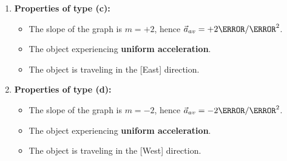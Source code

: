 \documentclass[12pt]{article}
\theoremstyle{break}
\begin{document}
\begin{enumerate}[label = (\alph*)]
	\item 
		
		\textbf{\large{Properties of type (c):}}
		\begin{itemize}
			\item The slope of the graph is $m = +2$, hence $\vec a_{av} = +2\m / \s^2$.
			\item The object experiencing \textbf{uniform acceleration}.
			\item The object is traveling in the [East] direction.
		\end{itemize}

	\item 
		
		\textbf{\large{Properties of type (d):}}
		\begin{itemize}
			\item The slope of the graph is $m = -2$, hence $\vec a_{av} = -2\m / \s^2$.
			\item The object experiencing \textbf{uniform acceleration}.
			\item The object is traveling in the [West] direction.
		\end{itemize}

	\end{enumerate}
\end{document}
